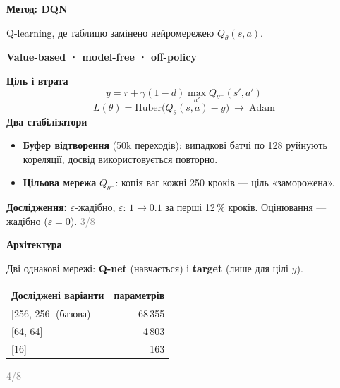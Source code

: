 \documentclass[10pt]{article}
\newcommand{\slidetitle}[1]{{\color{acc}\Large\bfseries #1}\par\vspace{1mm}{\color{acc}\rule{\linewidth}{1pt}}\par\vspace{2.5mm}}
\newcommand{\num}[2]{\hfill\textcolor{gray}{\footnotesize #1/#2}}
\begin{document}
\slidetitle{Метод: DQN}
Q-learning, де таблицю замінено нейромережею $Q_\theta(s,a)$.\par\vspace{2mm}
\textbf{Value-based · model-free · off-policy}\par\vspace{3mm}
\textbf{Ціль і втрата}
\[
y=r+\gamma(1-d)\max_{a'}Q_{\theta^-}(s',a')
\]
\[
L(\theta)=\mathrm{Huber}\bigl(Q_\theta(s,a)-y\bigr)\ \to\ \text{Adam}
\]
\textbf{Два стабілізатори}
\begin{itemize}
\item \textbf{Буфер відтворення} (50k переходів): випадкові батчі по 128 руйнують кореляції, досвід використовується повторно.
\item \textbf{Цільова мережа} $Q_{\theta^-}$: копія ваг кожні 250 кроків — ціль «заморожена».
\end{itemize}\vspace{2mm}
\textbf{Дослідження:} $\varepsilon$-жадібно, $\varepsilon$: $1\to0.1$ за перші 12\,\% кроків. Оцінювання — жадібно ($\varepsilon=0$).
\vfill\num{3}{8}
\newpage

\slidetitle{Архітектура}
\begin{center}
\end{center}
Дві однакові мережі: \textbf{Q-net} (навчається) і \textbf{target} (лише для цілі $y$).\par\vspace{3mm}
\begin{tabular}{@{}lr@{}}\toprule
Досліджені варіанти & параметрів\\ \midrule
{[256, 256]} (базова) & 68\,355\\
{[64, 64]} & 4\,803\\
{[16]} & 163\\ \bottomrule
\end{tabular}
\vfill\num{4}{8}
\newpage
\end{document}

